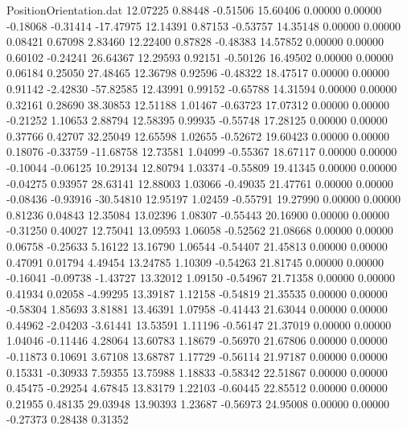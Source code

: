 \begin{filecontents}{PositionOrientation.dat}
  12.07225    0.88448   -0.51506    15.60406    0.00000    0.00000   -0.18068   -0.31414  -17.47975
  12.14391    0.87153   -0.53757    14.35148    0.00000    0.00000    0.08421    0.67098    2.83460
  12.22400    0.87828   -0.48383    14.57852    0.00000    0.00000    0.60102   -0.24241   26.64367
  12.29593    0.92151   -0.50126    16.49502    0.00000    0.00000    0.06184    0.25050   27.48465
  12.36798    0.92596   -0.48322    18.47517    0.00000    0.00000    0.91142   -2.42830  -57.82585
  12.43991    0.99152   -0.65788    14.31594    0.00000    0.00000    0.32161    0.28690   38.30853
  12.51188    1.01467   -0.63723    17.07312    0.00000    0.00000   -0.21252    1.10653    2.88794
  12.58395    0.99935   -0.55748    17.28125    0.00000    0.00000    0.37766    0.42707   32.25049
  12.65598    1.02655   -0.52672    19.60423    0.00000    0.00000    0.18076   -0.33759  -11.68758
  12.73581    1.04099   -0.55367    18.67117    0.00000    0.00000   -0.10044   -0.06125   10.29134
  12.80794    1.03374   -0.55809    19.41345    0.00000    0.00000   -0.04275    0.93957   28.63141
  12.88003    1.03066   -0.49035    21.47761    0.00000    0.00000   -0.08436   -0.93916  -30.54810
  12.95197    1.02459   -0.55791    19.27990    0.00000    0.00000    0.81236    0.04843   12.35084
  13.02396    1.08307   -0.55443    20.16900    0.00000    0.00000   -0.31250    0.40027   12.75041
  13.09593    1.06058   -0.52562    21.08668    0.00000    0.00000    0.06758   -0.25633    5.16122
  13.16790    1.06544   -0.54407    21.45813    0.00000    0.00000    0.47091    0.01794    4.49454
  13.24785    1.10309   -0.54263    21.81745    0.00000    0.00000   -0.16041   -0.09738   -1.43727
  13.32012    1.09150   -0.54967    21.71358    0.00000    0.00000    0.41934    0.02058   -4.99295
  13.39187    1.12158   -0.54819    21.35535    0.00000    0.00000   -0.58304    1.85693    3.81881
  13.46391    1.07958   -0.41443    21.63044    0.00000    0.00000    0.44962   -2.04203   -3.61441
  13.53591    1.11196   -0.56147    21.37019    0.00000    0.00000    1.04046   -0.11446    4.28064
  13.60783    1.18679   -0.56970    21.67806    0.00000    0.00000   -0.11873    0.10691    3.67108
  13.68787    1.17729   -0.56114    21.97187    0.00000    0.00000    0.15331   -0.30933    7.59355
  13.75988    1.18833   -0.58342    22.51867    0.00000    0.00000    0.45475   -0.29254    4.67845
  13.83179    1.22103   -0.60445    22.85512    0.00000    0.00000    0.21955    0.48135   29.03948
  13.90393    1.23687   -0.56973    24.95008    0.00000    0.00000   -0.27373    0.28438    0.31352

\end{filecontents}
